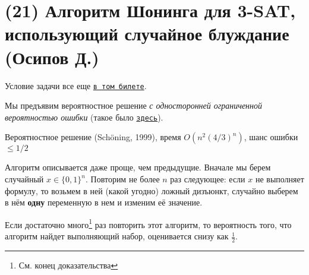 \section{(21) Алгоритм Шонинга для 3-SAT, использующий случайное блуждание (Осипов Д.)}

Условие задачи все еще \hyperlink{3sat}{\texttt{в том билете}}.

Мы предъявим вероятностное решение \textit{с односторонней ограниченной вероятностью ошибки} (такое было \hyperlink{Freivalds}{\texttt{здесь}}).

\begin{algodescription}{Вероятностное решение (Sch\"oning, 1999), время $O(n^2(4/3)^n)$, шанс ошибки $\leq 1/2$ }

Алгоритм описывается даже проще, чем предыдущие. Вначале мы берем случайный $x \in \{0, 1\}^n$. Повторим не более $n$ раз следующее: если $x$ не выполняет формулу, то возьмем в ней (какой угодно) ложный дизъюнкт, случайно выберем в нём \textbf{одну} переменную в нем и изменим её значение. 
\end{algodescription}

\begin{theorem*}
    Если достаточно много\footnote{См. конец доказательства} раз повторить этот алгоритм, то вероятность того, что алгоритм найдет выполняющий набор, оценивается снизу как $\frac{1}{2}$.
\end{theorem*}

